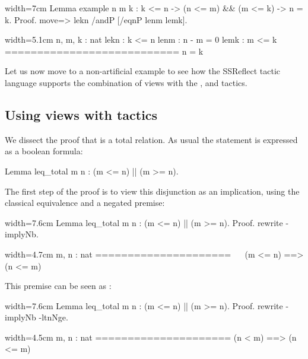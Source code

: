 \begin{coq-left}{}{width=7cm}
Lemma example n m k : k <= n ->
  (n <= m) && (m <= k) -> n = k.
Proof.
move=> lekn /andP [/eqnP lenm lemk].
$~$
$~$
\end{coq-left}
\begin{coqout-right}{}{width=5.1cm}
n, m, k : nat
lekn : k <= n
lenm : n - m = 0
lemk : m <= k
===========================
n = k
\end{coqout-right}


Let us now move to a non-artificial example to see how the SSReflect
tactic language supports the combination of views with the ,
 and  tactics.

\subsection{Using views with tactics}\label{sec:viewtac}

We dissect the proof that \C{<=} is a total relation.
As usual the statement is expressed as a boolean formula:

\begin{coq}{}{}
Lemma leq_total m n : (m <= n) || (m >= n).
\end{coq}

The first step of the proof is to view this disjunction as an
implication, using the classical equivalence and a negated premise:

\begin{coq-left}{}{width=7.6cm}
Lemma leq_total m n :
  (m <= n) || (m >= n).
Proof.
rewrite -implyNb.
\end{coq-left}
\begin{coqout-right}{}{width=4.7cm}
m, n : nat
=====================
~~ (m <= n) ==> (n <= m)
$~$
\end{coqout-right}

This premise can be seen as :

\begin{coq-left}{}{width=7.6cm}
Lemma leq_total m n :
  (m <= n) || (m >= n).
Proof.
rewrite -implyNb -ltnNge.
\end{coq-left}
\begin{coqout-right}{}{width=4.5cm}
m, n : nat
=====================
(n < m) ==> (n <= m)
$~$
\end{coqout-right}

